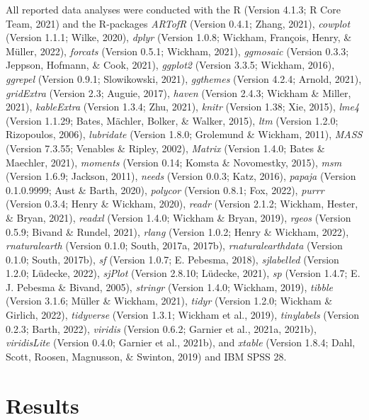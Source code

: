 \documentclass[
  man,floatsintext]{apa6}
\begin{document}
All reported data analyses were conducted with the R (Version 4.1.3; R Core Team, 2021) and the R-packages \emph{ARTofR} (Version 0.4.1; Zhang, 2021), \emph{cowplot} (Version 1.1.1; Wilke, 2020), \emph{dplyr} (Version 1.0.8; Wickham, François, Henry, \& Müller, 2022), \emph{forcats} (Version 0.5.1; Wickham, 2021), \emph{ggmosaic} (Version 0.3.3; Jeppson, Hofmann, \& Cook, 2021), \emph{ggplot2} (Version 3.3.5; Wickham, 2016), \emph{ggrepel} (Version 0.9.1; Slowikowski, 2021), \emph{ggthemes} (Version 4.2.4; Arnold, 2021), \emph{gridExtra} (Version 2.3; Auguie, 2017), \emph{haven} (Version 2.4.3; Wickham \& Miller, 2021), \emph{kableExtra} (Version 1.3.4; Zhu, 2021), \emph{knitr} (Version 1.38; Xie, 2015), \emph{lme4} (Version 1.1.29; Bates, Mächler, Bolker, \& Walker, 2015), \emph{ltm} (Version 1.2.0; Rizopoulos, 2006), \emph{lubridate} (Version 1.8.0; Grolemund \& Wickham, 2011), \emph{MASS} (Version 7.3.55; Venables \& Ripley, 2002), \emph{Matrix} (Version 1.4.0; Bates \& Maechler, 2021), \emph{moments} (Version 0.14; Komsta \& Novomestky, 2015), \emph{msm} (Version 1.6.9; Jackson, 2011), \emph{needs} (Version 0.0.3; Katz, 2016), \emph{papaja} (Version 0.1.0.9999; Aust \& Barth, 2020), \emph{polycor} (Version 0.8.1; Fox, 2022), \emph{purrr} (Version 0.3.4; Henry \& Wickham, 2020), \emph{readr} (Version 2.1.2; Wickham, Hester, \& Bryan, 2021), \emph{readxl} (Version 1.4.0; Wickham \& Bryan, 2019), \emph{rgeos} (Version 0.5.9; Bivand \& Rundel, 2021), \emph{rlang} (Version 1.0.2; Henry \& Wickham, 2022), \emph{rnaturalearth} (Version 0.1.0; South, 2017a, 2017b), \emph{rnaturalearthdata} (Version 0.1.0; South, 2017b), \emph{sf} (Version 1.0.7; E. Pebesma, 2018), \emph{sjlabelled} (Version 1.2.0; Lüdecke, 2022), \emph{sjPlot} (Version 2.8.10; Lüdecke, 2021), \emph{sp} (Version 1.4.7; E. J. Pebesma \& Bivand, 2005), \emph{stringr} (Version 1.4.0; Wickham, 2019), \emph{tibble} (Version 3.1.6; Müller \& Wickham, 2021), \emph{tidyr} (Version 1.2.0; Wickham \& Girlich, 2022), \emph{tidyverse} (Version 1.3.1; Wickham et al., 2019), \emph{tinylabels} (Version 0.2.3; Barth, 2022), \emph{viridis} (Version 0.6.2; Garnier et al., 2021a, 2021b), \emph{viridisLite} (Version 0.4.0; Garnier et al., 2021b), and \emph{xtable} (Version 1.8.4; Dahl, Scott, Roosen, Magnusson, \& Swinton, 2019) and IBM SPSS 28.

\hypertarget{results}{%
\section{Results}\label{results}}
\end{document}
